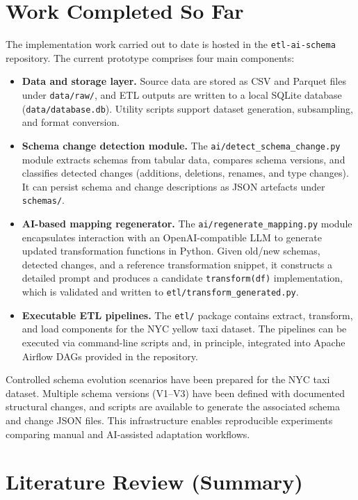 \section{Work Completed So Far}

The implementation work carried out to date is hosted in the
\texttt{etl-ai-schema} repository. The current prototype comprises four main
components:
%
\begin{itemize}
  \item \textbf{Data and storage layer.} Source data are stored as CSV and
  Parquet files under \texttt{data/raw/}, and ETL outputs are written to a
  local SQLite database (\texttt{data/database.db}). Utility scripts support
  dataset generation, subsampling, and format conversion.
  \item \textbf{Schema change detection module.} The
  \texttt{ai/detect\_schema\_change.py} module extracts schemas from tabular
  data, compares schema versions, and classifies detected changes (additions,
  deletions, renames, and type changes). It can persist schema and change
  descriptions as JSON artefacts under \texttt{schemas/}.
  \item \textbf{AI-based mapping regenerator.} The
  \texttt{ai/regenerate\_mapping.py} module encapsulates interaction with an
  OpenAI-compatible LLM to generate updated transformation functions in Python.
  Given old/new schemas, detected changes, and a reference transformation
  snippet, it constructs a detailed prompt and produces a candidate
  \texttt{transform(df)} implementation, which is validated and written to
  \texttt{etl/transform\_generated.py}.
  \item \textbf{Executable ETL pipelines.} The \texttt{etl/} package contains
  extract, transform, and load components for the NYC yellow taxi dataset. The
  pipelines can be executed via command-line scripts and, in principle,
  integrated into Apache Airflow DAGs provided in the repository.
\end{itemize}

Controlled schema evolution scenarios have been prepared for the NYC taxi
dataset. Multiple schema versions (V1--V3) have been defined with documented
structural changes, and scripts are available to generate the associated
schema and change JSON files. This infrastructure enables reproducible
experiments comparing manual and AI-assisted adaptation workflows.

\section{Literature Review (Summary)}

